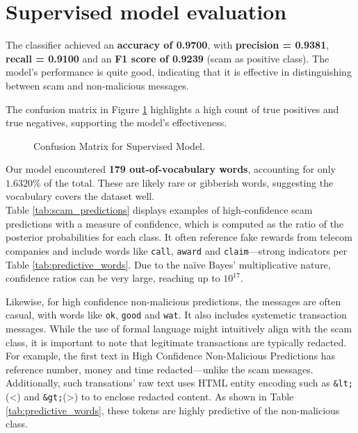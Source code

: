\documentclass[a4paper,12pt]{article}
\begin{document}
\section{Supervised model evaluation}
\label{sec:supervised-model-training}

The classifier achieved an \textbf{accuracy of 0.9700}, with \textbf{precision = 0.9381}, \textbf{recall = 0.9100} and an \textbf{F1 score of 0.9239} (scam as positive class). The model's performance is quite good, indicating that it is effective in distinguishing between scam and non-malicious messages.

The confusion matrix in Figure \ref{fig:base} highlights a high count of true positives and true negatives, supporting the model's effectiveness.

\begin{figure}[H]
    \centering
    
    \caption{Confusion Matrix for Supervised Model.}
    \label{fig:base}
\end{figure}

Our model encountered \textbf{179 out-of-vocabulary words}, accounting for only $1.6320\%$ of the total. These are likely rare or gibberish words, suggesting the vocabulary covers the dataset well. \\

Table \ref{tab:scam_predictions} displays examples of high-confidence scam predictions with a measure of confidence, which is computed as the ratio of the posterior probabilities for each class. It often reference fake rewards from telecom companies and include words like \texttt{call}, \texttt{award} and \texttt{claim}—strong indicators per Table \ref{tab:predictive_words}. Due to the naïve Bayes' multiplicative nature, confidence ratios can be very large, reaching up to $10^{17}$.

Likewise, for high confidence non-malicious predictions, the messages are often casual, with words like \texttt{ok}, \texttt{good} and \texttt{wat}. It also includes systemetic transaction messages. While the use of formal language might intuitively align with the scam class, it is important to note that legitimate transactions are typically redacted. For example, the first text in High Confidence Non-Malicious Predictions has reference number, money and time redacted—unlike the scam messages. Additionally, such transations' raw text uses HTML entity encoding such as \texttt{\&lt;}(\textless) and \texttt{\&gt;}(\textgreater) to to enclose redacted content. As shown in Table \ref{tab:predictive_words}, these tokens are highly predictive of the non-malicious class.
\end{document}
